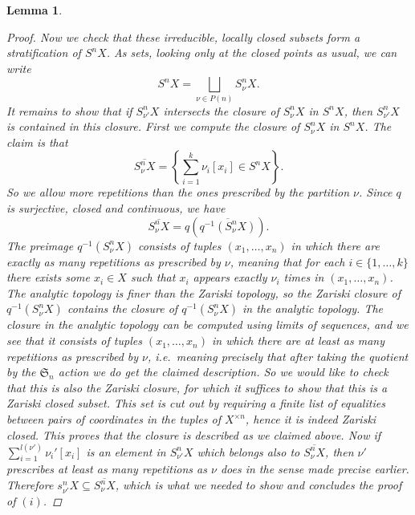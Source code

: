 \documentclass[12pt,a4paper]{amsart}
\theoremstyle{plain}
\newtheorem{lm}[thm]{Lemma}
\theoremstyle{definition}
\theoremstyle{remark}
\begin{document}
\begin{lm}
\begin{proof}
    Now we check that these irreducible, locally closed subsets form a stratification of $S^{n}X$.
    As sets, looking only at the closed points as usual, we can write
    \[ S^{n}X = \bigsqcup_{\nu \in P(n)} S^{n}_{\nu}X. \]
    It remains to show that if $S^{n}_{\nu'}X$ intersects the closure of $S^{n}_{\nu}X$ in $S^{n}X$, then $S^{n}_{\nu'}X$ is contained in this closure.
    First we compute the closure of $S^{n}_{\nu}X$ in $S^{n}X$.
    The claim is that
    \[ \overline{S^{n}_{\nu}X} = \left\{ \sum_{i=1}^{k} \nu_{i} [x_{i}] \in S^{n}X \right\}. \]
    So we allow more repetitions than the ones prescribed by the partition $\nu$.
    Since $q$ is surjective, closed and continuous, we have
    \[ \overline{S^{n}_{\nu}X} = q(\overline{q^{-1}(S^{n}_{\nu}X)}). \]
    The preimage $q^{-1}(S^{n}_{\nu}X)$ consists of tuples $(x_{1}, \ldots, x_{n})$ in which there are exactly as many repetitions as prescribed by $\nu$, meaning that for each $i \in \{1, \ldots, k\}$ there exists some $x_{i} \in X$ such that $x_{i}$ appears exactly $\nu_{i}$ times in $(x_{1}, \ldots, x_{n})$.
    The analytic topology is finer than the Zariski topology, so the Zariski closure of $q^{-1}(S^{n}_{\nu}X)$ contains the closure of $q^{-1}(S^{n}_{\nu}X)$ in the analytic topology.
    The closure in the analytic topology can be computed using limits of sequences, and we see that it consists of tuples $(x_{1}, \ldots, x_{n})$ in which there are at least as many repetitions as prescribed by $\nu$, i.e.~meaning precisely that after taking the quotient by the $\mathfrak{S}_{n}$ action we do get the claimed description.
    So we would like to check that this is also the Zariski closure, for which it suffices to show that this is a Zariski closed subset.
    This set is cut out by requiring a finite list of equalities between pairs of coordinates in the tuples of $X^{\times n}$, hence it is indeed Zariski closed.
    This proves that the closure is described as we claimed above.
    Now if $\sum_{i=1}^{l(\nu')}\nu_{i}'[x_{i}]$ is an element in $S^{n}_{\nu'}X$ which belongs also to $\overline{S^{n}_{\nu}X}$, then $\nu'$ prescribes at least as many repetitions as $\nu$ does in the sense made precise earlier.
    Therefore $s^{n}_{\nu'}X \subseteq \overline{S^{n}_{\nu}X}$, which is what we needed to show and concludes the proof of $(i)$.
  \end{proof}
\end{lm}
\end{document}

